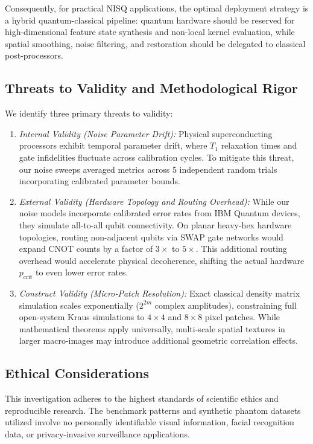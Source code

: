 \documentclass[12pt,onecolumn,draftclsnofoot]{IEEEtran}
\begin{document}
Consequently, for practical NISQ applications, the optimal deployment strategy is a hybrid quantum-classical pipeline: quantum hardware should be reserved for high-dimensional feature state synthesis and non-local kernel evaluation, while spatial smoothing, noise filtering, and restoration should be delegated to classical post-processors.

\subsection{Threats to Validity and Methodological Rigor}
We identify three primary threats to validity:
\begin{enumerate}
    \item \textit{Internal Validity (Noise Parameter Drift):} Physical superconducting processors exhibit temporal parameter drift, where $T_1$ relaxation times and gate infidelities fluctuate across calibration cycles. To mitigate this threat, our noise sweeps averaged metrics across 5 independent random trials incorporating calibrated parameter bounds.
    \item \textit{External Validity (Hardware Topology and Routing Overhead):} While our noise models incorporate calibrated error rates from IBM Quantum devices, they simulate all-to-all qubit connectivity. On planar heavy-hex hardware topologies, routing non-adjacent qubits via SWAP gate networks would expand CNOT counts by a factor of $3\times$ to $5\times$. This additional routing overhead would accelerate physical decoherence, shifting the actual hardware $p_{\text{crit}}$ to even lower error rates.
    \item \textit{Construct Validity (Micro-Patch Resolution):} Exact classical density matrix simulation scales exponentially ($2^{2m}$ complex amplitudes), constraining full open-system Kraus simulations to $4 \times 4$ and $8 \times 8$ pixel patches. While mathematical theorems apply universally, multi-scale spatial textures in larger macro-images may introduce additional geometric correlation effects.
\end{enumerate}

\subsection{Ethical Considerations}
This investigation adheres to the highest standards of scientific ethics and reproducible research. The benchmark patterns and synthetic phantom datasets utilized involve no personally identifiable visual information, facial recognition data, or privacy-invasive surveillance applications.
\end{document}
